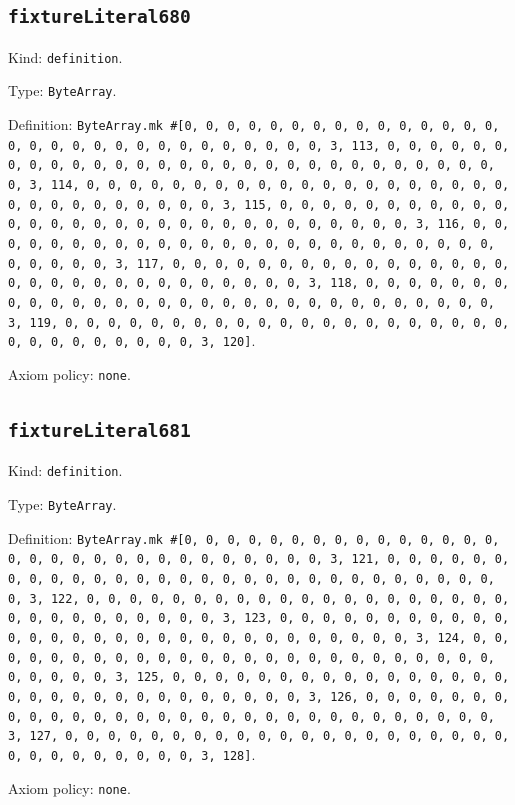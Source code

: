 \documentclass[11pt]{article}
\begin{document}
\subsection*{\texttt{fixtureLiteral680}}
\noindent Kind: \texttt{definition}.\par
\noindent Type: \texttt{ByteArray}.\par
\noindent Definition: \texttt{ByteArray.mk \#[0, 0, 0, 0, 0, 0, 0, 0, 0, 0, 0, 0, 0, 0, 0, 0, 0, 0, 0, 0, 0, 0, 0, 0, 0, 0, 0, 0, 0, 0, 3, 113, 0, 0, 0, 0, 0, 0, 0, 0, 0, 0, 0, 0, 0, 0, 0, 0, 0, 0, 0, 0, 0, 0, 0, 0, 0, 0, 0, 0, 0, 0, 3, 114, 0, 0, 0, 0, 0, 0, 0, 0, 0, 0, 0, 0, 0, 0, 0, 0, 0, 0, 0, 0, 0, 0, 0, 0, 0, 0, 0, 0, 0, 0, 3, 115, 0, 0, 0, 0, 0, 0, 0, 0, 0, 0, 0, 0, 0, 0, 0, 0, 0, 0, 0, 0, 0, 0, 0, 0, 0, 0, 0, 0, 0, 0, 3, 116, 0, 0, 0, 0, 0, 0, 0, 0, 0, 0, 0, 0, 0, 0, 0, 0, 0, 0, 0, 0, 0, 0, 0, 0, 0, 0, 0, 0, 0, 0, 3, 117, 0, 0, 0, 0, 0, 0, 0, 0, 0, 0, 0, 0, 0, 0, 0, 0, 0, 0, 0, 0, 0, 0, 0, 0, 0, 0, 0, 0, 0, 0, 3, 118, 0, 0, 0, 0, 0, 0, 0, 0, 0, 0, 0, 0, 0, 0, 0, 0, 0, 0, 0, 0, 0, 0, 0, 0, 0, 0, 0, 0, 0, 0, 3, 119, 0, 0, 0, 0, 0, 0, 0, 0, 0, 0, 0, 0, 0, 0, 0, 0, 0, 0, 0, 0, 0, 0, 0, 0, 0, 0, 0, 0, 0, 0, 3, 120]}.\par
\noindent Axiom policy: \texttt{none}.\par
\subsection*{\texttt{fixtureLiteral681}}
\noindent Kind: \texttt{definition}.\par
\noindent Type: \texttt{ByteArray}.\par
\noindent Definition: \texttt{ByteArray.mk \#[0, 0, 0, 0, 0, 0, 0, 0, 0, 0, 0, 0, 0, 0, 0, 0, 0, 0, 0, 0, 0, 0, 0, 0, 0, 0, 0, 0, 0, 0, 3, 121, 0, 0, 0, 0, 0, 0, 0, 0, 0, 0, 0, 0, 0, 0, 0, 0, 0, 0, 0, 0, 0, 0, 0, 0, 0, 0, 0, 0, 0, 0, 3, 122, 0, 0, 0, 0, 0, 0, 0, 0, 0, 0, 0, 0, 0, 0, 0, 0, 0, 0, 0, 0, 0, 0, 0, 0, 0, 0, 0, 0, 0, 0, 3, 123, 0, 0, 0, 0, 0, 0, 0, 0, 0, 0, 0, 0, 0, 0, 0, 0, 0, 0, 0, 0, 0, 0, 0, 0, 0, 0, 0, 0, 0, 0, 3, 124, 0, 0, 0, 0, 0, 0, 0, 0, 0, 0, 0, 0, 0, 0, 0, 0, 0, 0, 0, 0, 0, 0, 0, 0, 0, 0, 0, 0, 0, 0, 3, 125, 0, 0, 0, 0, 0, 0, 0, 0, 0, 0, 0, 0, 0, 0, 0, 0, 0, 0, 0, 0, 0, 0, 0, 0, 0, 0, 0, 0, 0, 0, 3, 126, 0, 0, 0, 0, 0, 0, 0, 0, 0, 0, 0, 0, 0, 0, 0, 0, 0, 0, 0, 0, 0, 0, 0, 0, 0, 0, 0, 0, 0, 0, 3, 127, 0, 0, 0, 0, 0, 0, 0, 0, 0, 0, 0, 0, 0, 0, 0, 0, 0, 0, 0, 0, 0, 0, 0, 0, 0, 0, 0, 0, 0, 0, 3, 128]}.\par
\noindent Axiom policy: \texttt{none}.\par
\end{document}
